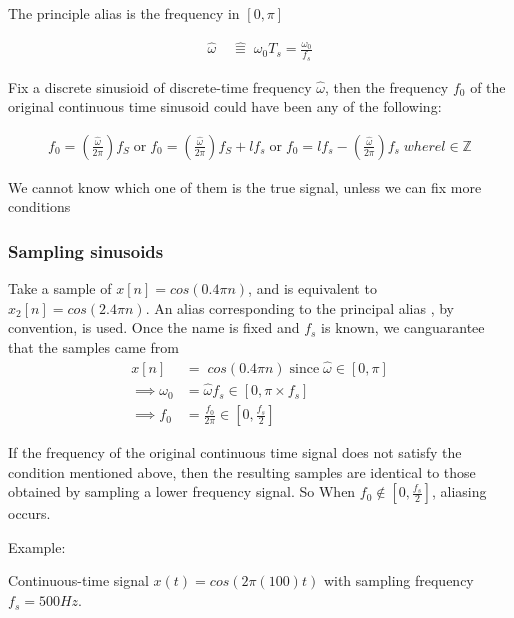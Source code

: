 \documentclass{article}
\begin{document}
    The principle alias is the frequency in $[0, \pi]$

    \begin{align}
        \hat{\omega}\; &\hat{\equiv}\; \omega_0 T_s = \frac{\omega_0}{f_s}
    \end{align}

    Fix a discrete sinusioid of discrete-time frequency $\hat{\omega}$, then the frequency $f_0$ of the original continuous
    time sinusoid could have been any of the following:

    \begin{align}
        f_0 = (\frac{\hat{\omega}}{2\pi})f_S \;\text{or}\; f_0 = (\frac{\hat{\omega}}{2\pi})f_S + lf_s \;\text{or}\; f_0 =  lf_s - (\frac{\hat{\omega}}{2\pi})f_s \; where l \in \mathbb{Z}
    \end{align}

    We cannot know which one of them is the true signal, unless we can fix more conditions

    \subsubsection{Sampling sinusoids}

    Take a sample of $x[n] = cos(0.4 \pi n)$, and is equivalent to $x_2[n] = cos(2.4 \pi n)$. An alias corresponding to the principal alias , by convention, is used.
    Once the name is fixed and $f_s$ is known, we canguarantee that the samples came from 
    \begin{align}
        x[n] &=\; cos(0.4 \pi n) \;\text{since}\; \hat{\omega} \in [0,\pi] \\
        \implies \omega_0 &=  \hat{\omega} f_s \in [0,\pi \times f_s]\\
        \implies f_0 &= \frac{f_0}{2\pi} \in [0, \frac{f_s}{2}]
    \end{align}

    If the frequency of the original continuous time signal does not satisfy the condition mentioned above, 
    then the resulting samples are identical to those obtained by sampling a lower frequency signal. So When
    $f_0 \notin [0, \frac{f_s}{2}]$, aliasing occurs.

    Example:

    Continuous-time signal $x(t) = cos(2\pi (100) t)$ with sampling frequency $f_s = 500 Hz$. 

    \begin{center}
    \end{center}
\end{document}
